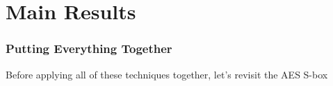 \documentclass[handout,10pt]{beamer}
\begin{document}








\section{Main Results}
\begin{frame}
	\frametitle{Putting Everything Together}
	\begin{center}
		Before applying all of these techniques together, let's revisit the AES S-box
	\end{center}
\end{frame}
\end{document}
